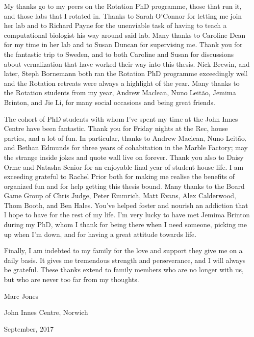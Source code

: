 \documentclass[12pt,]{book}
\begin{document}
My thanks go to my peers on the Rotation PhD programme, those that run
it, and those labs that I rotated in. Thanks to Sarah O'Connor for
letting me join her lab and to Richard Payne for the unenviable task of
having to teach a computational biologist his way around said lab. Many
thanks to Caroline Dean for my time in her lab and to Susan Duncan for
supervising me. Thank you for the fantastic trip to Sweden, and to both
Caroline and Susan for discussions about vernalization that have worked
their way into this thesis. Nick Brewin, and later, Steph Bornemann both
ran the Rotation PhD programme exceedingly well and the Rotation
retreats were always a highlight of the year. Many thanks to the
Rotation students from my year, Andrew Maclean, Nuno Leitão, Jemima
Brinton, and Jie Li, for many social occasions and being great friends.

The cohort of PhD students with whom I've spent my time at the John
Innes Centre have been fantastic. Thank you for Friday nights at the
Rec, house parties, and a lot of fun. In particular, thanks to Andrew
Maclean, Nuno Leitão, and Bethan Edmunds for three years of cohabitation
in the Marble Factory; may the strange inside jokes and quote wall live
on forever. Thank you also to Daisy Orme and Natasha Senior for an
enjoyable final year of student house life. I am exceeding grateful to
Rachel Prior both for making me realise the benefits of organized fun
and for help getting this thesis bound. Many thanks to the Board Game
Group of Chris Judge, Peter Emmrich, Matt Evans, Alex Calderwood, Thom
Booth, and Ben Hales. You've helped foster and nourish an addiction that
I hope to have for the rest of my life. I'm very lucky to have met
Jemima Brinton during my PhD, whom I thank for being there when I need
someone, picking me up when I'm down, and for having a great attitude
towards life.

Finally, I am indebted to my family for the love and support they give
me on a daily basis. It gives me tremendous strength and perseverance,
and I will always be grateful. These thanks extend to family members who
are no longer with us, but who are never too far from my thoughts.

\vspace{1.5cm}

\setlength{\leftskip}{2cm}

Marc Jones

John Innes Centre, Norwich

September, 2017

\setlength{\leftskip}{0pt}
\end{document}
